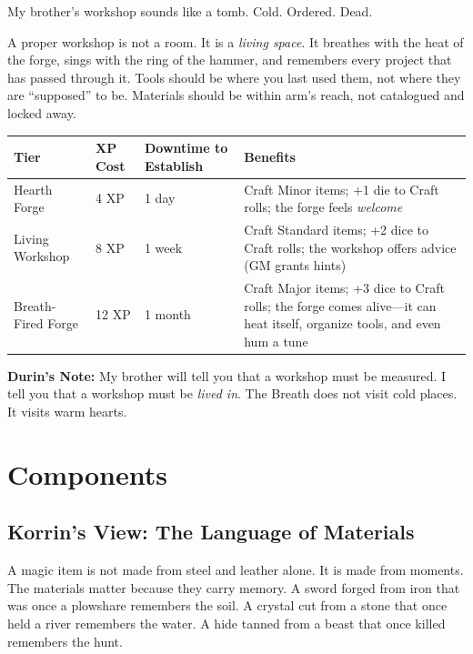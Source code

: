 \documentclass[11pt]{book}
\begin{document}
My brother's workshop sounds like a tomb. Cold. Ordered. Dead.

A proper workshop is not a room. It is a \textit{living space}. It breathes with the heat of the forge, sings with the ring of the hammer, and remembers every project that has passed through it. Tools should be where you last used them, not where they are ``supposed'' to be. Materials should be within arm's reach, not catalogued and locked away.

\begin{table}[h]
\centering
\begin{tabular}{@{}llll@{}}
\toprule
\textbf{Tier} & \textbf{XP Cost} & \textbf{Downtime to Establish} & \textbf{Benefits} \\
\midrule
Hearth Forge & 4 XP & 1 day & Craft Minor items; +1 die to Craft rolls; the forge feels \textit{welcome} \\
Living Workshop & 8 XP & 1 week & Craft Standard items; +2 dice to Craft rolls; the workshop offers advice (GM grants hints) \\
Breath-Fired Forge & 12 XP & 1 month & Craft Major items; +3 dice to Craft rolls; the forge comes alive---it can heat itself, organize tools, and even hum a tune \\
\bottomrule
\end{tabular}
\end{table}

\vspace{0.5cm}
\textbf{Durin's Note:} My brother will tell you that a workshop must be measured. I tell you that a workshop must be \textit{lived in}. The Breath does not visit cold places. It visits warm hearts.

\newpage
\section{Components}

\subsection*{Korrin's View: The Language of Materials}

A magic item is not made from steel and leather alone. It is made from moments. The materials matter because they carry memory. A sword forged from iron that was once a plowshare remembers the soil. A crystal cut from a stone that once held a river remembers the water. A hide tanned from a beast that once killed remembers the hunt.
\end{document}
